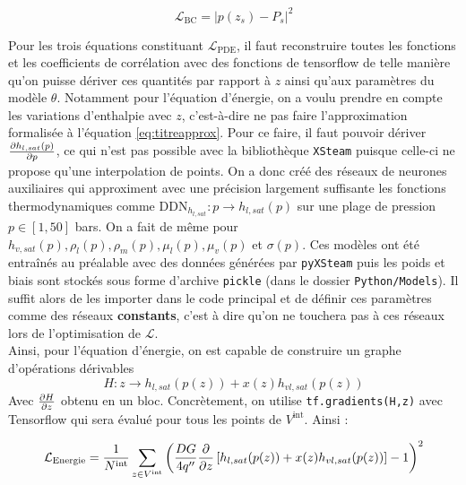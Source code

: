 \begin{equation}
    \mathcal{L}_{\text{BC}} = \left| p(z_s) - P_s\right|^2
\end{equation}

Pour les trois équations constituant $\mathcal{L}_{\text{PDE}}$, il faut reconstruire toutes les fonctions et les coefficients de corrélation avec des fonctions de tensorflow de telle manière qu'on puisse dériver ces quantités par rapport à $z$ ainsi qu'aux paramètres du modèle $\theta$. Notamment pour l'équation d'énergie, on a voulu prendre en compte les variations d'enthalpie avec $z$, c'est-à-dire ne pas faire l'approximation formalisée à l'équation \ref{eq:titreapprox}. Pour ce faire, il faut pouvoir dériver $\pder[h_{l,sat}(p)]{p}$, ce qui n'est pas possible avec la bibliothèque \verb|XSteam| puisque celle-ci ne propose qu'une interpolation de points. On a donc créé des réseaux de neurones auxiliaires qui approximent avec une précision largement suffisante les fonctions thermodynamiques comme $\text{DDN}_{h_{l,sat}} : p \rightarrow h_{l,sat}(p)$ sur une plage de pression $p \in[1, 50]$ bars. On a fait de même pour $h_{v,sat}(p),\rho_l(p),\rho_m(p),\mu_l(p),\mu_v(p)$ et $\sigma(p)$. Ces modèles ont été entraînés au préalable avec des données générées par \verb|pyXSteam| puis les poids et biais sont stockés sous forme d'archive \verb|pickle| (dans le dossier \verb|Python/Models|). Il suffit alors de les importer dans le code principal et de définir ces paramètres comme des réseaux \textbf{constants}, c'est à dire qu'on ne touchera pas à ces réseaux lors de l'optimisation de $\mathcal{L}$.\\

Ainsi, pour l'équation d'énergie, on est capable de construire un graphe d'opérations dérivables 
\begin{equation}
    H : z \rightarrow h_{l,sat}(p(z)) + x(z)h_{vl,sat}(p(z))
\end{equation}
Avec $\pder[H]{z}$ obtenu en un bloc. Concrètement, on utilise \verb|tf.gradients(H,z)| avec Tensorflow qui sera évalué pour tous les points de $V^{\text{int}}$. Ainsi :

\begin{equation}
    \mathcal{L}_{\text{Energie}} =\frac{1}{N^{\text{int}}}\sum_{z\in V^{\text{int}}} \left( \frac{DG}{4q''}\pder{z}\left[ h_{l,sat}(p(z)) + x(z)h_{vl,sat}(p(z)) \right] -1  \right)^2
    \label{eq:titrednn}
\end{equation}

